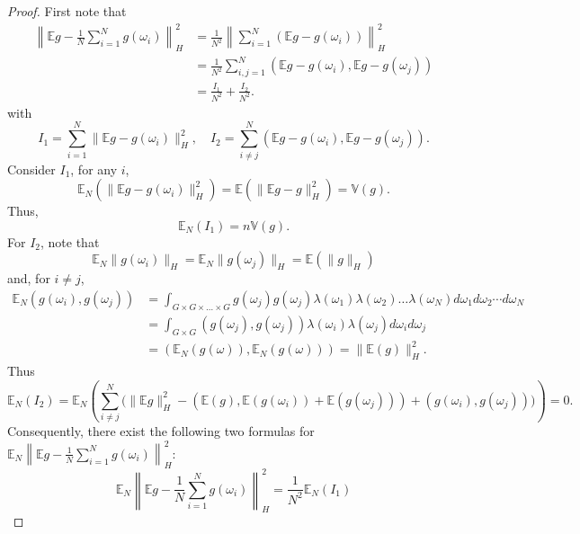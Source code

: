 \begin{proof}%
First note that
 \begin{equation}
    \label{eqn}
    \begin{aligned}
\left\|\mathbb{E} g-\frac1N\sum_{i=1}^Ng(\omega_i)\right\|_H^2 
  & 
=\frac{1}{N^2} \left\|\sum_{i=1}^N(\mathbb{E} g-g(\omega_i))\right\|_H^2 
  \\
  &=\frac{1}{N^2} \sum_{i,j=1}^N\left(\mathbb{E} g-g(\omega_i), \mathbb{E} g-g(\omega_j)\right)
  \\
  &=\frac{I_1}{N^2} +\frac{I_2}{N^2}.
    \end{aligned}
  \end{equation}
with 
\begin{equation}
I_1= \sum_{i=1}^N\|\mathbb{E} g-g(\omega_i)\|_H^2,\quad I_2=\sum_{i\neq  j}^N\left(\mathbb{E} g-g(\omega_i), \mathbb{E} g-g(\omega_j)\right).
\end{equation}
Consider $I_1$, for any $i$,
 $$
 \mathbb{E}_N(\|\mathbb{E} g-g(\omega_i)\|_H^2)
 =\mathbb{E}(\|\mathbb{E} g-g\|_H^2) = \mathbb{V}(g).
 $$ 
Thus,
$$
 \mathbb{E}_N (I_1) = n\mathbb{V}(g).
$$
For $I_2$, note that
$$
\mathbb E_N \|g(\omega_i)\|_H=\mathbb E_N \|g(\omega_j)\|_H =\mathbb E(\|g\|_H)
$$
and, for $i\neq j$,
\begin{equation}\label{key}
\begin{aligned}
\mathbb {E}_N ( g(\omega_i), g(\omega_j)) &= 
\int_{G\times G\times\ldots\times G}
g(\omega_j) g(\omega_j) \lambda(\omega_1) \lambda(\omega_2)\ldots \lambda(\omega_N)
d\omega_1d\omega_2\cdots d\omega_N \\
&= \int_{G\times G} (g(\omega_j) , g(\omega_j) ) 
\lambda(\omega_i) \lambda(\omega_j)
d\omega_id\omega_j \\
&=\left( \mathbb {E}_N (
g(\omega)) , \mathbb {E}_N(g(\omega))\right)
=\|\mathbb E(g)\|_H^2.
\end{aligned}
\end{equation}
Thus
 \begin{equation}
\mathbb{E}_N (I_2) = \mathbb{E}_N \left( \sum_{i\neq j}^N\big(\|\mathbb{E}g\|_H^2-
(\mathbb  E(g), \mathbb E(g(\omega_i))+ \mathbb E(g(\omega_j)))
+ (g(\omega_i), g(\omega_j))\big) \right)=0.
  \end{equation}
Consequently, there exist the following two formulas for $\displaystyle \mathbb{E}_N\left\|\mathbb{E} g-
      \frac1N\sum_{i=1}^Ng(\omega_i)\right\|_H^2$:
 \begin{equation} 
 \mathbb{E}_N\left\|\mathbb{E} g-
      \frac1N\sum_{i=1}^Ng(\omega_i)\right\|_H^2 = \frac{1}{N^2}\mathbb{E}_N (I_1)

\end{equation}
\end{proof}
